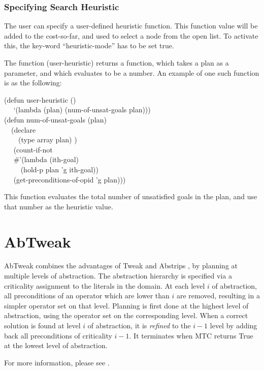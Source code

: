 \subsubsection{Specifying Search Heuristic}
The user can specify a user-defined heuristic function.  This function
value will be added to the cost-so-far, and used to select a node from
the open list.  To activate this, the key-word ``heuristic-mode'' has
to be set true.

The function (user-heuristic) returns a function, which takes a plan
as a parameter, and which evaluates to be a number.  An example of one
such function is as the following:
\begin{tabbing}
(defun {\rm user-heuristic} () \\
~~ `(lambda (plan) ({\rm num-of-unsat-goals} plan)))\\

(defun {\rm num-of-unsat-goals} (plan)\\
~~(declare \\
~~~~(type array plan) )\\
~~  (count-if-not\\
~~  \#'(lambda (ith-goal)\\
~~~~       (hold-p plan 'g ith-goal))\\
~~   (get-preconditions-of-opid 'g plan)))
\end{tabbing}
This function evaluates the total number of unsatisfied goals in the
plan, and use that number as the heuristic value.

\section{AbTweak}
AbTweak combines the advantages of Tweak and Abstrips
\cite{abstrips}, by planning at multiple levels of abstraction.  The
abstraction hierarchy is specified via a criticality assignment to the
literals in the domain.  At each level $i$ of abstraction, all
preconditions of an operator which are lower than $i$ are removed,
resulting in a simpler operator set on that level.  Planning is first
done at the highest level of abstraction, using the operator set on
the corresponding level.  When a correct solution is found at level
$i$ of abstraction, it is {\em refined} to the $i-1$ level by adding
back all preconditions of criticality $i-1$.  It terminates when MTC
returns True at the lowest level of abstraction.

For more information, please see \cite{abtweak}.

